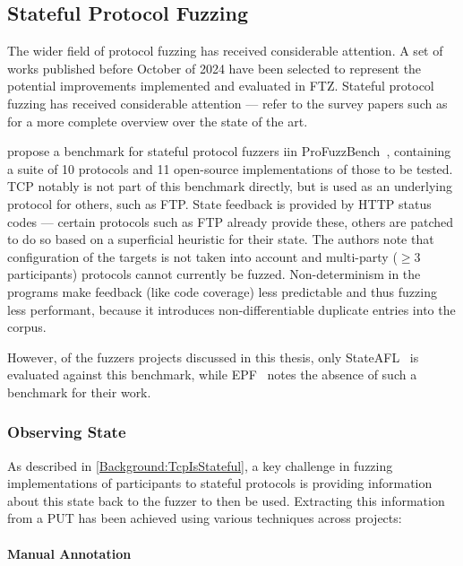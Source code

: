 \documentclass[twocolumn]{article}
\newcommand{\proj}{FTZ\xspace}
\let\savedCite=\cite
\renewcommand{\cite}{\unskip~\savedCite}
\begin{document}
\subsection{Stateful Protocol Fuzzing}
\label{RelatedWorks:ProtocolFuzzing}

The wider field of protocol fuzzing has received considerable attention. A set of works published before October of 2024 have been selected to represent the potential improvements implemented and evaluated in \proj. Stateful protocol fuzzing has received considerable attention — refer to the survey papers such as \cite{StatefulReview,Survey,IndustrialReview} for a more complete overview over the state of the art.

\citeauthor{ProFuzzBench} propose a benchmark for stateful protocol fuzzers iin ProFuzzBench\cite{ProFuzzBench}, containing a suite of 10 protocols and 11 open-source implementations of those to be tested. TCP notably is not part of this benchmark directly, but is used as an underlying protocol for others, such as FTP. State feedback is provided by HTTP status codes — certain protocols such as FTP already provide these, others are patched to do so based on a superficial heuristic for their state. The authors note that configuration of the targets is not taken into account and multi-party ($\geq 3$ participants) protocols cannot currently be fuzzed. Non-determinism in the programs make feedback (like code coverage) less predictable and thus fuzzing less performant, because it introduces non-differentiable duplicate entries into the corpus.

However, of the fuzzers projects discussed in this thesis, only StateAFL\cite{StateAFL} is evaluated against this benchmark, while EPF\cite{EPF} notes the absence of such a benchmark for their work.

\subsubsection{Observing State}

As described in \cref{Background:TcpIsStateful}, a key challenge in fuzzing implementations of participants to stateful protocols is providing information about this state back to the fuzzer to then be used. Extracting this information from a PUT has been achieved using various techniques across projects:

\paragraph{Manual Annotation}
\end{document}
